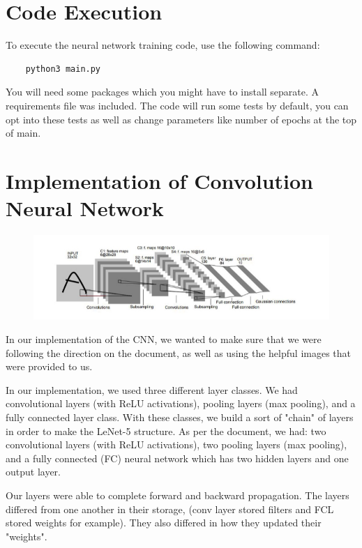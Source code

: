 \documentclass{article}
\begin{document}
\section{Code Execution}

To execute the neural network training code, use the following command:
\begin{verbatim}
    python3 main.py
\end{verbatim}

You will need some packages which you might have to install separate. A requirements file was included. The code will run some tests by default, you can opt into these tests as well as change parameters like number of epochs at the top of main.

\section{Implementation of Convolution Neural Network}

\begin{figure}[!h]
    \centering
    \includegraphics[width=0.75\linewidth]{figs/Capture.PNG}
\end{figure}

In our implementation of the CNN, we wanted to make sure that we were following the direction on the document, as well as using the helpful images that were provided to us.

In our implementation, we used three different layer classes. We had convolutional layers (with ReLU activations), pooling
layers (max pooling), and a fully connected layer class. With these classes, we build a sort of "chain" of layers in order to make the LeNet-5 structure. As per the document, we had: two convolutional layers (with ReLU activations), two pooling
layers (max pooling), and a fully connected (FC) neural network which has two hidden layers and one output layer. 

Our layers were able to complete forward and backward propagation. The layers differed from one another in their storage, (conv layer stored filters and FCL stored weights for example). They also differed in how they updated their "weights".
\end{document}
